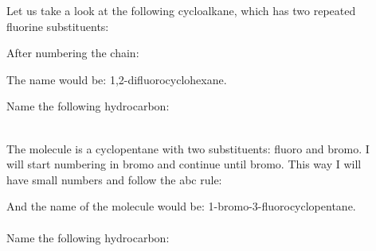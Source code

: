\documentclass[main.tex]{subfiles}
\begin{document}
\begin{description}
\item[] Let us take a look at the following cycloalkane, which has two repeated fluorine substituents:
\begin{center} \end{center}
After numbering the chain:
\begin{center}\end{center}
The name would be: 1,2-difluorocyclohexane.
\begin{example} %
Name the following hydrocarbon:
\begin{center}\end{center}
\\
The molecule is a cyclopentane with two substituents: fluoro and bromo. I will start numbering in bromo and continue until bromo. This way I will have small numbers and follow the abc rule:
\begin{center}\end{center}
And the name of the molecule would be: 1-bromo-3-fluorocyclopentane.\\
\faDiamond\ \\
Name the following hydrocarbon:
\begin{center}\end{center}
\end{example}%


\end{description}
\end{document}
